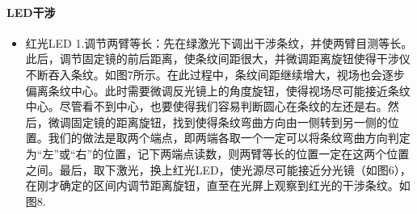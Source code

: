 \documentclass[10pt]{ctexart}
\begin{document}
\paragraph{LED干涉}
    

\begin{itemize}
    \item 红光LED
    1.调节两臂等长：先在绿激光下调出干涉条纹，并使两臂目测等长。此后，调节固定镜的前后距离，使条纹间距很大，并微调距离旋钮使得干涉仪不断吞入条纹。如图7所示。在此过程中，条纹间距继续增大，视场也会逐步偏离条纹中心。此时需要微调反光镜上的角度旋钮，使得视场尽可能接近条纹中心。尽管看不到中心，也要使得我们容易判断圆心在条纹的左还是右。然后，微调固定镜的距离旋钮，找到使得条纹弯曲方向由一侧转到另一侧的位置。我们的做法是取两个端点，即两端各取一个一定可以将条纹弯曲方向判定为“左”或“右”的位置，记下两端点读数，则两臂等长的位置一定在这两个位置之间。最后，取下激光，换上红光LED，使光源尽可能接近分光镜（如图6），在刚才确定的区间内调节距离旋钮，直至在光屏上观察到红光的干涉条纹。如图8.
    

\end{itemize}
\end{document}
